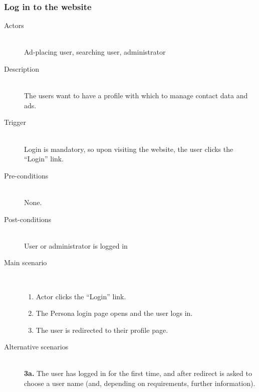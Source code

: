 \documentclass[a4wide]{article}
\begin{document}
\subsubsection{Log in to the website}
\begin{description}
\item[Actors]\mbox{}\\
Ad-placing user, searching user, administrator
\item[Description]\mbox{}\\
The users want to have a profile with which to manage contact data and ads.
\item[Trigger]\mbox{}\\
Login is mandatory, so upon visiting the website, the user clicks the “Login” link.
\item[Pre-conditions]\mbox{}\\
None.
\item[Post-conditions]\mbox{}\\
User or administrator is logged in
\item[Main scenario]\mbox{}\\
\begin{enumerate}
\item Actor clicks the “Login” link.
\item The Persona login page opens and the user logs in.
\item The user is redirected to their profile page.
\end{enumerate}
\item[Alternative scenarios]\mbox{}\\
\textbf{3a.} The user has logged in for the first time, and after redirect is asked to choose a user name (and, depending on requirements, further information).
\end{description}
\end{document}
